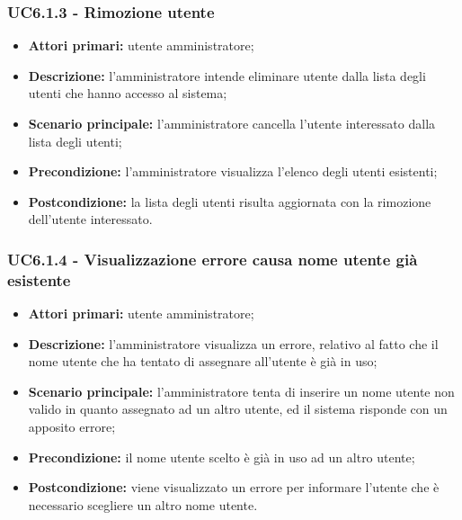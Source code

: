 \subsubsection{UC6.1.3 - Rimozione utente}
\begin{itemize}
	\item \textbf{Attori primari:} utente amministratore;
	\item \textbf{Descrizione:} l'amministratore intende eliminare utente dalla lista degli utenti che hanno accesso al sistema;
	\item \textbf{Scenario principale:} l'amministratore cancella l'utente interessato dalla lista degli utenti;
	\item \textbf{Precondizione:} l'amministratore visualizza l'elenco degli utenti esistenti;
	\item \textbf{Postcondizione:} la lista degli utenti risulta aggiornata con la rimozione dell'utente interessato.
\end{itemize}

\subsubsection{UC6.1.4 - Visualizzazione errore causa nome utente già esistente}
\begin{itemize}
	\item \textbf{Attori primari:} utente amministratore;
	\item \textbf{Descrizione:} l'amministratore visualizza un errore, relativo al fatto che il nome utente che ha tentato di assegnare all'utente è già in uso;
	\item \textbf{Scenario principale:} l'amministratore tenta di inserire un nome utente non valido in quanto assegnato ad un altro utente, ed il sistema risponde con un apposito errore;
	\item \textbf{Precondizione:} il nome utente scelto è già in uso ad un altro utente;
	\item \textbf{Postcondizione:} viene visualizzato un errore per informare l'utente che è necessario scegliere un altro nome utente.
\end{itemize}

